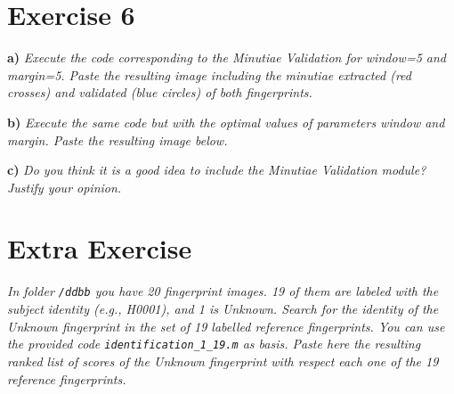 \documentclass[11pt]{article}
\begin{document}
\section{Exercise 6}

\textbf{a) }\emph{Execute the code corresponding to the Minutiae Validation for window=5 and margin=5.  Paste the resulting image including the minutiae extracted (red crosses) and validated (blue circles) of both fingerprints. }

\textbf{b) }\emph{Execute the same code but with the optimal values of parameters window and margin. Paste the resulting image below.}

\textbf{c) }\emph{Do you think it is a good idea to include the Minutiae Validation module? Justify your opinion.}

\section{Extra Exercise}

\emph{In folder \texttt{/ddbb} you have 20 fingerprint images. 19 of them are labeled with the subject identity (e.g., H0001), and 1 is Unknown. Search for the identity of the Unknown fingerprint in the set of 19 labelled reference fingerprints. You can use the provided code \texttt{identification\_1\_19.m} as basis. Paste here the resulting ranked list of scores of the Unknown fingerprint with respect each one of the 19 reference fingerprints.}
\end{document}
